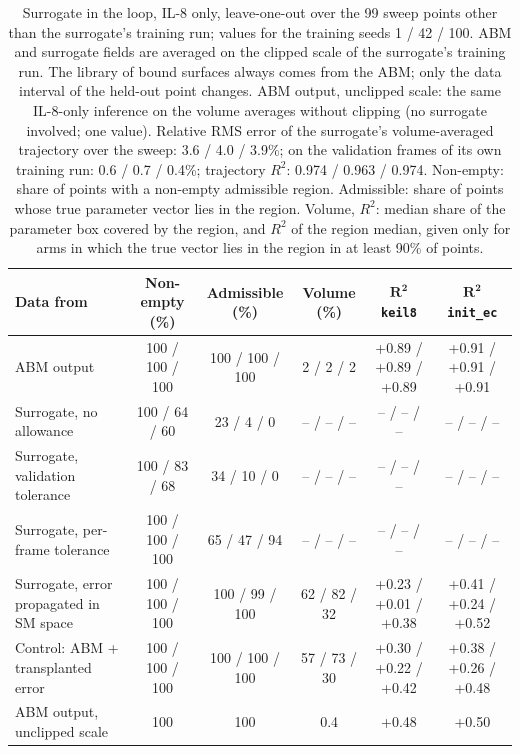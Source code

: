 \begin{table}[!htbp]
\caption{Surrogate in the loop, IL-8 only, leave-one-out over the 99 sweep points other than the surrogate's training run; values for the training seeds 1 / 42 / 100. ABM and surrogate fields are averaged on the clipped scale of the surrogate's training run. The library of bound surfaces always comes from the ABM; only the data interval of the held-out point changes. ABM output, unclipped scale: the same IL-8-only inference on the volume averages without clipping (no surrogate involved; one value). Relative RMS error of the surrogate's volume-averaged trajectory over the sweep: 3.6 / 4.0 / 3.9\%; on the validation frames of its own training run: 0.6 / 0.7 / 0.4\%; trajectory $R^2$: 0.974 / 0.963 / 0.974. Non-empty: share of points with a non-empty admissible region. Admissible: share of points whose true parameter vector lies in the region. Volume, $R^2$: median share of the parameter box covered by the region, and $R^2$ of the region median, given only for arms in which the true vector lies in the region in at least 90\% of points.}
\label{tab:loop}
\centering\footnotesize
\setlength{\tabcolsep}{4pt}
\begin{tabular}{lccccc}
\toprule
\textbf{Data from} & \textbf{Non-empty (\%)} & \textbf{Admissible (\%)} & \textbf{Volume (\%)} & $\mathbf{R^2}$ \texttt{keil8} & $\mathbf{R^2}$ \texttt{init\_ec} \\
\midrule
ABM output & 100 / 100 / 100 & 100 / 100 / 100 & 2 / 2 / 2 & +0.89 / +0.89 / +0.89 & +0.91 / +0.91 / +0.91 \\
Surrogate, no allowance & 100 / 64 / 60 & 23 / 4 / 0 & -- / -- / -- & -- / -- / -- & -- / -- / -- \\
Surrogate, validation tolerance & 100 / 83 / 68 & 34 / 10 / 0 & -- / -- / -- & -- / -- / -- & -- / -- / -- \\
Surrogate, per-frame tolerance & 100 / 100 / 100 & 65 / 47 / 94 & -- / -- / -- & -- / -- / -- & -- / -- / -- \\
Surrogate, error propagated in SM space & 100 / 100 / 100 & 100 / 99 / 100 & 62 / 82 / 32 & +0.23 / +0.01 / +0.38 & +0.41 / +0.24 / +0.52 \\
Control: ABM + transplanted error & 100 / 100 / 100 & 100 / 100 / 100 & 57 / 73 / 30 & +0.30 / +0.22 / +0.42 & +0.38 / +0.26 / +0.48 \\
ABM output, unclipped scale & 100 & 100 & 0.4 & +0.48 & +0.50 \\
\bottomrule
\end{tabular}
\end{table}
